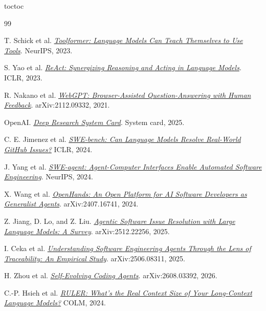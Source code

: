 \documentclass[10pt,a4paper,UTF8,fontset=none]{ctexart}
\let\BilingualOriginalAddContentsLine\addcontentsline
\def\BilingualTocExtension{entoc}
\renewcommand{\addcontentsline}[3]{%
  \def\BilingualRequestedExtension{#1}%
  \def\BilingualStandardToc{toc}%
  \ifx\BilingualRequestedExtension\BilingualStandardToc
    \BilingualOriginalAddContentsLine{\BilingualTocExtension}{#2}{#3}%
  \else
    \BilingualOriginalAddContentsLine{#1}{#2}{#3}%
  \fi
}
\begin{document}
\clearpage
{}
{}
\begin{thebibliography}{99}
\small
\setlength{\itemsep}{1pt}
\setlength{\parskip}{0pt}

T. Schick et al. \href{https://arxiv.org/abs/2302.04761}{\textit{Toolformer: Language Models Can Teach Themselves to Use Tools}}. NeurIPS, 2023.

S. Yao et al. \href{https://arxiv.org/abs/2210.03629}{\textit{ReAct: Synergizing Reasoning and Acting in Language Models}}. ICLR, 2023.

R. Nakano et al. \href{https://arxiv.org/abs/2112.09332}{\textit{WebGPT: Browser-Assisted Question-Answering with Human Feedback}}. arXiv:2112.09332, 2021.

OpenAI. \href{https://openai.com/index/deep-research-system-card/}{\textit{Deep Research System Card}}. System card, 2025.

C. E. Jimenez et al. \href{https://openreview.net/forum?id=VTF8yNQM66}{\textit{SWE-bench: Can Language Models Resolve Real-World GitHub Issues?}} ICLR, 2024.

J. Yang et al. \href{https://arxiv.org/abs/2405.15793}{\textit{SWE-agent: Agent-Computer Interfaces Enable Automated Software Engineering}}. NeurIPS, 2024.

X. Wang et al. \href{https://arxiv.org/abs/2407.16741}{\textit{OpenHands: An Open Platform for AI Software Developers as Generalist Agents}}. arXiv:2407.16741, 2024.

Z. Jiang, D. Lo, and Z. Liu. \href{https://arxiv.org/abs/2512.22256}{\textit{Agentic Software Issue Resolution with Large Language Models: A Survey}}. arXiv:2512.22256, 2025.

I. Ceka et al. \href{https://arxiv.org/abs/2506.08311}{\textit{Understanding Software Engineering Agents Through the Lens of Traceability: An Empirical Study}}. arXiv:2506.08311, 2025.

H. Zhou et al. \href{https://arxiv.org/abs/2608.03392}{\textit{Self-Evolving Coding Agents}}. arXiv:2608.03392, 2026.

C.-P. Hsieh et al. \href{https://arxiv.org/abs/2404.06654}{\textit{RULER: What's the Real Context Size of Your Long-Context Language Models?}} COLM, 2024.


\end{thebibliography}
\end{document}
